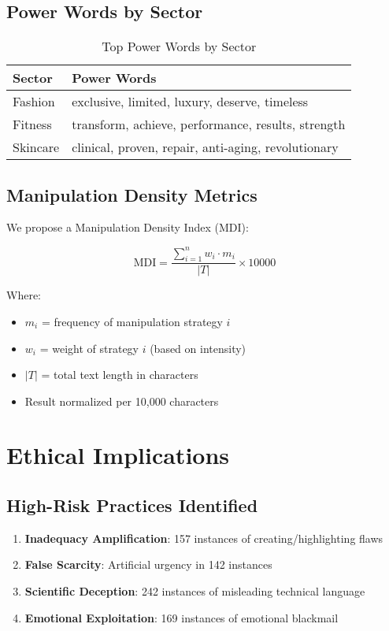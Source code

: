 \subsection{Power Words by Sector}

\begin{table}[h!]
\centering
\caption{Top Power Words by Sector}
\begin{tabular}{l|l}
\toprule
\textbf{Sector} & \textbf{Power Words} \\
\midrule
Fashion & exclusive, limited, luxury, deserve, timeless \\
Fitness & transform, achieve, performance, results, strength \\
Skincare & clinical, proven, repair, anti-aging, revolutionary \\
\bottomrule
\end{tabular}
\end{table}

\subsection{Manipulation Density Metrics}

We propose a Manipulation Density Index (MDI):

\begin{equation}
\text{MDI} = \frac{\sum_{i=1}^{n} w_i \cdot m_i}{|T|} \times 10000
\end{equation}

Where:
\begin{itemize}
    \item $m_i$ = frequency of manipulation strategy $i$
    \item $w_i$ = weight of strategy $i$ (based on intensity)
    \item $|T|$ = total text length in characters
    \item Result normalized per 10,000 characters
\end{itemize}

\section{Ethical Implications}

\subsection{High-Risk Practices Identified}

\begin{enumerate}
    \item \textbf{Inadequacy Amplification}: 157 instances of creating/highlighting flaws
    \item \textbf{False Scarcity}: Artificial urgency in 142 instances
    \item \textbf{Scientific Deception}: 242 instances of misleading technical language
    \item \textbf{Emotional Exploitation}: 169 instances of emotional blackmail
\end{enumerate}

